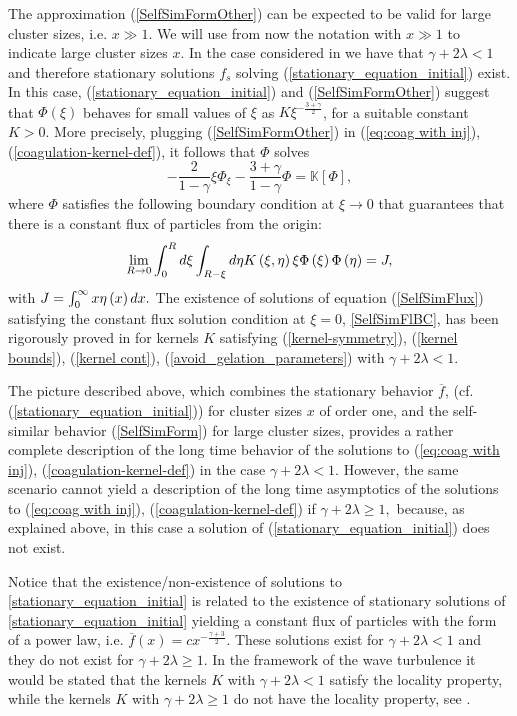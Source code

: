 \documentclass[11pt]{article}
\numberwithin{equation}{section}
\theoremstyle{plain}
\newcommand{\der}{\textup{d}}
\begin{document}
The approximation (\ref{SelfSimFormOther}) can be expected to be valid for large
cluster sizes, i.e. $x\gg1$. We will use from now the notation with $x\gg1$ to indicate large cluster sizes $x$.
In the case considered in \cite{davies1999smoluchowski} we have that $\gamma+2\lambda<1$ and
therefore stationary solutions $f_{s}$ solving (\ref{stationary_equation_initial}) exist. In this case, (\ref{stationary_equation_initial}) and (\ref{SelfSimFormOther}) suggest that $\Phi\left(
\xi\right)$ behaves for small values of $\xi$ as $K\xi^{-\frac{3+\gamma}{2}}$, for a suitable constant $K>0.$ More precisely, plugging (\ref{SelfSimFormOther}) in (\ref{eq:coag with inj}), (\ref{coagulation-kernel-def}), it follows that $\Phi$ solves
\begin{equation}
-\frac{2}{1-\gamma}\xi\Phi_{\xi}-\frac{3+\gamma}{1-\gamma}\Phi=\mathbb{K}
\left[  \Phi\right], \label{SelfSimFlux}
\end{equation}
where $\Phi$ satisfies the following boundary condition at $\xi\rightarrow0$ that guarantees that there is a constant flux of particles from the origin: 
\begin{equation}
\lim_{R\rightarrow0}\int_{0}^{R}\der\xi\int_{R-\xi}\der\eta K\left(  \xi
,\eta\right)  \xi\Phi\left(  \xi\right)  \Phi\left(  \eta\right)  =J,
\label{SelfSimFlBC}
\end{equation}
with $J=\int_{0}^{\infty}x\eta\left(  x\right)  \der x.$
The existence of solutions of equation
(\ref{SelfSimFlux}) satisfying the constant flux solution condition at $\xi=0$, \eqref{SelfSimFlBC}, 
has been rigorously proved in \cite{ferreira2021self} for kernels $K$
satisfying (\ref{kernel-symmetry}), (\ref{kernel bounds}), (\ref{kernel cont}),
(\ref{avoid_gelation_parameters}) with $\gamma + 2 \lambda<1$.

The picture described above, which combines the stationary behavior $\overline{f}$, (cf. (\ref{stationary_equation_initial})) for cluster sizes $x$ of order one, and the self-similar behavior (\ref{SelfSimForm}) for large cluster sizes, provides a rather complete description of the long time behavior of the solutions to (\ref{eq:coag with inj}), (\ref{coagulation-kernel-def}) in the case $\gamma+2\lambda<1.$
However, the same scenario cannot yield a description of the long time asymptotics of the solutions to (\ref{eq:coag with inj}), (\ref{coagulation-kernel-def}) if $\gamma+2\lambda\geq1,$ because, as explained above, in this case a solution of (\ref{stationary_equation_initial})
does not exist. 


Notice that the existence/non-existence of solutions to \eqref{stationary_equation_initial} is related to the existence of stationary solutions of \eqref{stationary_equation_initial} yielding a constant flux of particles with the form of a power law, i.e. $\overline{f}(x)= cx^{- \frac{\gamma + 3 }{2}}$. These solutions exist for $\gamma + 2 \lambda < 1 $ and they do not exist for $\gamma + 2 \lambda \geq 1 $. In the framework of the wave turbulence it would be stated that the kernels $K$ with $\gamma + 2 \lambda < 1 $ satisfy the locality property, while the kernels $K$ with $\gamma + 2 \lambda \geq 1 $ do not have the locality property, see \cite{zel2002physics}. 
\end{document}

